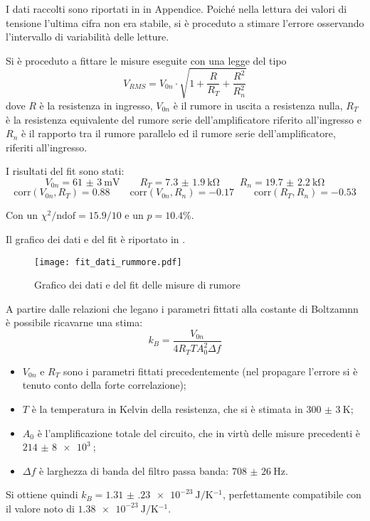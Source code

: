 I dati raccolti sono riportati in  in Appendice. Poiché nella lettura dei valori di tensione l'ultima cifra non era stabile, si è proceduto a stimare l'errore osservando l'intervallo di variabilità delle letture.

Si è proceduto a fittare le misure eseguite con una legge del tipo
$$V_{RMS} = V_{0n} \cdot \sqrt{1+\frac{R}{R_T} + \frac{R^2}{R_n^2}}$$
dove $R$ è la resistenza in ingresso, $V_{0n}$ è il rumore in uscita a resistenza nulla, $R_T$ è la resistenza equivalente del rumore serie dell’amplificatore riferito all’ingresso e $R_n$ è il rapporto tra il rumore parallelo ed il rumore serie dell’amplificatore,
riferiti all’ingresso.

I risultati del fit sono stati:
$$V_{0n} = \SI{61(3)}{\milli\volt} \qquad R_T = \SI{7.3(19)}{\kilo\ohm} \qquad R_n = \SI{19.7(22)}{\kilo\ohm}$$
$$ \text{corr}(V_{0n},R_T)=0.88 \qquad \text{corr}(V_{0n},R_n)=-0.17 \qquad \text{corr}(R_T,R_n)=-0.53$$

Con un $\chi^2 / \text{ndof} = 15.9 / 10$ e un $p = 10.4 \%$.

Il grafico dei dati e del fit è riportato in .

	\begin{figure}[H]
		\centering
		\texttt{[image: fit\_dati\_rummore.pdf]}
		\caption{Grafico dei dati e del fit delle misure di rumore}
		\label{fig:fit_rumore}
	\end{figure}

A partire dalle relazioni che legano i parametri fittati alla costante di Boltzamnn è possibile ricavarne una stima:
$$ k_B = \frac{V_{0n}}{4R_T T A_0^2 \Delta f}$$
\begin{itemize}
	\item $V_{0n}$ e $R_T$ sono i parametri fittati precedentemente (nel propagare l'errore si è tenuto conto della forte correlazione);
	\item $T$ è la temperatura in Kelvin della resistenza, che si è stimata in $\SI{300(3)}{\K}$;
	\item $A_0$ è l'amplificazione totale del circuito, che in virtù delle misure precedenti è $\SI{214(8)e3}{}$;
	\item $\Delta f$ è larghezza di banda del filtro passa banda: $\SI{708(26)}{\hertz}$.
\end{itemize}

Si ottiene quindi $k_B = \SI{1.31(23)e-23}{\J \per \kelvin^{-1}}$, perfettamente compatibile con il valore noto di $\SI{1.38e-23}{\J \per \kelvin^{-1}}$.
